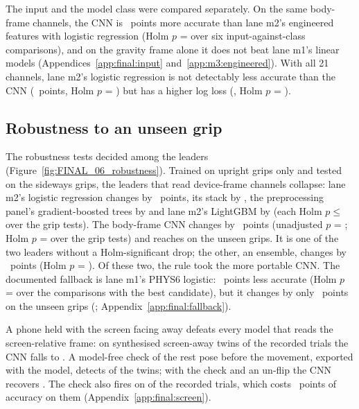 The input and the model class were compared separately. On the same body-frame channels, the CNN is
~points more accurate than lane m2's engineered features with logistic
regression (Holm $p$ =  over six input-against-class comparisons), and on the gravity frame alone it does not beat
lane m1's linear models (Appendices~\ref{app:final:input} and~\ref{app:m3:engineered}). With all 21 channels, lane
m2's logistic regression is not detectably less accurate than the CNN (~points,
Holm $p$ = ) but has a higher log loss (,
Holm $p$ = ).

\subsection{Robustness to an unseen grip}\label{sec:results:robustness}
The robustness tests decided among the leaders (Figure~\ref{fig:FINAL_06_robustness}). Trained on upright grips
only and tested on the sideways grips, the leaders that read device-frame channels collapse: lane m2's logistic
regression changes by ~points, its stack by , the
preprocessing panel's gradient-boosted trees by  and lane m2's LightGBM by
 (each Holm $p \le$  over the 
grip tests). The body-frame CNN changes by ~points (unadjusted $p$ =
; Holm $p$ =  over the  grip tests)
and reaches  on the unseen grips. It is one of the two leaders without a Holm-significant
drop; the other, an ensemble, changes by ~points (Holm $p$ =
). Of these two, the rule took the more portable CNN. The documented fallback is
lane m1's PHYS6 logistic: ~points less accurate (Holm $p$ =
 over the comparisons with the best candidate), but it changes by only
~points on the unseen grips (; Appendix~\ref{app:final:fallback}).

A phone held with the screen facing away defeats every model that reads the screen-relative frame: on synthesised
screen-away twins of the recorded trials the CNN falls to . A model-free check of the rest
pose before the movement, exported with the model, detects  of the twins; with the
check and an un-flip the CNN recovers . The check also fires on
 of the recorded trials, which costs ~points of accuracy
on them (Appendix~\ref{app:final:screen}).

